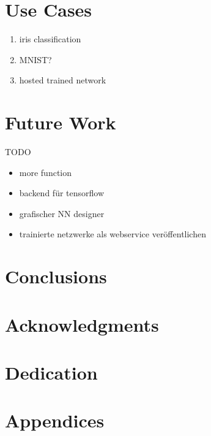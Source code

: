 
\chapter{Use Cases}\label{use-cases}

\begin{enumerate}
\def\labelenumi{\arabic{enumi})}
\item
  iris classification
\item
  MNIST?
\item
  hosted trained network
\end{enumerate}

\chapter{Future Work}\label{future-work}

TODO

\begin{itemize}
\tightlist
\item
  more function\\
\item
  backend für tensorflow
\item
  grafischer NN designer
\item
  trainierte netzwerke als webservice veröffentlichen
\end{itemize}

\chapter{Conclusions}\label{conclusions}

\chapter{Acknowledgments}\label{acknowledgments}

\chapter{Dedication}\label{dedication}

\chapter{Appendices}\label{appendices}
